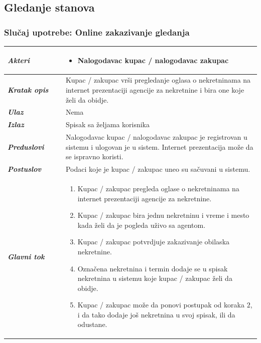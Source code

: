 \documentclass[20pt]{article}
\begin{document}
\newpage
\subsection{\bfseries \Large Gledanje stanova}
\setlength{\parindent}{1cm}
\fontsize{13}{18} \selectfont 
\subsubsection{\bfseries \large Slu\v{c}aj upotrebe: Online zakazivanje gledanja}
\begin{center}
\begin{tabular}{p{0.23\linewidth} p{0.77\linewidth}}
 \hline
 {\it \bfseries Akteri} & \begin{itemize}
    \item Nalogodavac kupac / nalogodavac zakupac
\end{itemize}\\
\hline

 {\it \bfseries Kratak opis} & Kupac / zakupac vr\v si pregledanje oglasa o nekretninama na internet prezentaciji agencije za nekretnine i bira one koje \v zeli da obidje.\\ 
 \hline
 
 {\it \bfseries Ulaz} & Nema\\ 
 \hline
 
 {\it \bfseries Izlaz} & Spisak sa \v zeljama korisnika\\
 \hline
 
 {\it \bfseries Preduslovi} & Nalogodavac kupac / nalogodavac zakupac je registrovan u sistemu i ulogovan je u sistem. Internet prezentacija mo\v ze da se ispravno koristi.\\
 \hline

 {\it \bfseries Postuslov} & Podaci koje je kupac / zakupac uneo su sa\v cuvani u sistemu.\\
 \hline

     {\it \bfseries Glavni tok} &  
     \begin{enumerate}
         \item  Kupac / zakupac pregleda oglase o nekretninama na internet prezentaciji agencije za nekretnine.
         \item  Kupac / zakupac bira jednu nekretninu i vreme i mesto kada \v zeli da je pogleda u\v zivo sa agentom.
         \item  Kupac / zakupac potvrdjuje zakazivanje obilaska nekretnine.
         \item  Označena nekretnina i termin dodaje se u spisak nekretnina u sistemu koje kupac / zakupac želi da obidje.
         \item  Kupac / zakupac mo\v ze da ponovi postupak od koraka $2$, i da tako dodaje jo\v s nekretnina u svoj spisak, ili da odustane.
    \end{enumerate}\\
 \hline


\end{tabular}
\end{center}
\end{document}
